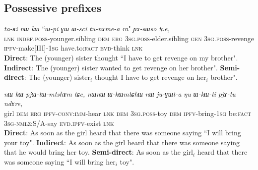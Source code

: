 \documentclass[11pt]{article}
\newcommand{\ipa}[1]{{\textit{\phon #1}}} %
\begin{document}
 
    
   \subsection{Possessive prefixes}
\begin{exe}
\ex
\gll  \ipa{tɕe}  	\ipa{ta-ʁi}  	\ipa{nɯ}  	\ipa{kɯ}  	``{\ipa{ɯ-pi}}  	\ipa{ɣɯ}  	\ipa{ɯ-sci}  	{\ipa{tu-nɤme-a}}  	\ipa{ra}" 	\ipa{ɲɤ-sɯso}  	\ipa{tɕe,}  	\\
\textsc{lnk}  \textsc{indef.poss}-younger.sibling \textsc{dem} \textsc{erg}  {\textsc{3sg.poss}-elder.sibling}  \textsc{gen} \textsc{3sg.poss}-revenge {\textsc{ipfv}-make[III]-\textsc{1sg}} have.to:\textsc{fact} \textsc{evd}-think \textsc{lnk} \\
\glt  \textbf{Direct}: The (younger) sister thought ``{I have to get revenge} on {my brother}".
\glt  \textbf{Indirect}:  The (younger) sister wanted to get revenge on {her brother}".
\glt  \textbf{Semi-direct}:  The (younger) sister$_i$ thought {I have to get revenge} on {her$_i$ brother}".
  \end{exe}
  
 
\begin{exe}
\ex
\gll   \ipa{tɤɕime}  	\ipa{nɯ}  	\ipa{kɯ}  	\ipa{pjɯ-tɯ-mtshɤm}  	\ipa{tɕe,}  	\ipa{nɯnɯ}  {\ipa{ɯ-kɯmtɕhɯ}}  	\ipa{nɯ}  	{\ipa{ju-ɣɯt-a}}  	\ipa{ŋu}  		\ipa{ɯ-kɯ-ti}  	\ipa{pjɤ-tu}  	\ipa{ndɤre,}  \\
girl \textsc{dem} \textsc{erg} \textsc{ipfv-conv:imm}-hear \textsc{lnk} \textsc{dem} {\textsc{3sg.poss}-toy} \textsc{dem} {\textsc{ipfv}-bring-\textsc{1sg}}  be:\textsc{fact} \textsc{3sg-nmlz}:S/A-say \textsc{evd.ipfv}-exist \textsc{lnk} \\
\glt   \textbf{Direct}: As soon as the girl heard that there was someone saying ``{I will bring} {your toy}".
\glt   \textbf{Indirect}:  As soon as the girl heard that there was someone saying that he would bring {her toy}.
\glt   \textbf{Semi-direct}: As soon as the girl$_i$ heard that there was someone saying ``{I will bring} {her$_i$ toy}".

  \end{exe}
  

 
%       
%   

        
	\def\newblock{}        

\end{document}
